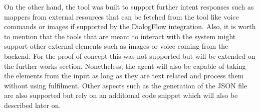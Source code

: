  On the other hand, the tool was built to support further intent responses such as mappers from external resources that can be fetched from the tool like voice commands or images if supported by the DialogFlow integration. Also, it is worth to mention that the tools that are meant to interact with the system might support other external elements such as images or voice coming from the backend. For the proof of concept this was not supported but will be extended on the further works section. Nonetheless, the agent will also be capable of taking the elements from the input as long as they are text related and process them without using fulfilment. Other aspects such as the generation of the JSON file are also supported but rely on an additional code snippet which will also be described later on. 
 
